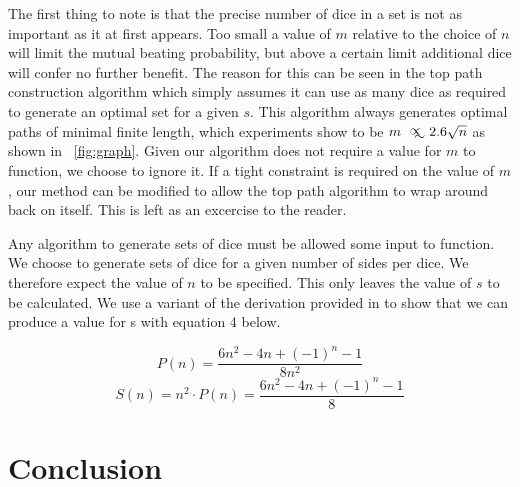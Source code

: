 \documentclass[a4paper,twocolumn]{article}
\begin{document}
The first thing to note is that the precise number of dice in a set is not as important as it at first appears. Too small a value of $m$ relative to the choice of $n$ will limit the mutual beating probability, but above a certain limit additional dice will confer no further benefit. The reason for this can be seen in the top path construction algorithm which simply assumes it can use as many dice as required to generate an optimal set for a given $s$. This algorithm always generates optimal paths of minimal finite length, which experiments show to be $m \approxprop 2.6\sqrt{n}$ as shown in \figurename~\ref{fig:graph}. Given our algorithm does not require a value for $m$ to function, we choose to ignore it. If a tight constraint is required on the value of $m$, our method can be modified to allow the top path algorithm to wrap around back on itself. This is left as an excercise to the reader.

Any algorithm to generate sets of dice must be allowed some input to function. We choose to generate sets of dice for a given number of sides per dice. We therefore expect the value of $n$ to be specified. This only leaves the value of $s$ to be calculated. We use a variant of the derivation provided in \cite{tenney1976non} to show that we can produce a value for s with equation 4 below.




\begin{equation}
P(n) = \frac{6n^2 -4n +(-1)^n -1}{8n^2}
\end{equation}
\begin{equation}
S(n) = n^2\cdot P(n) = \frac{6n^2 -4n +(-1)^n -1}{8}
\end{equation}
\section*{Conclusion}



\end{document}
